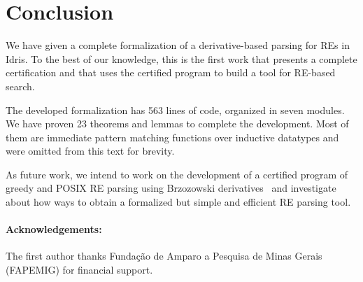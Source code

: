 \documentclass{llncs}
\begin{document}
\section{Conclusion}\label{sec:conclusion}

We have given a complete formalization of a derivative-based parsing
for REs in Idris. To the best of our knowledge, this is the first work
that presents a complete certification and that uses the certified
program to build a tool for RE-based search.

The developed formalization has 563 lines of code, organized in seven
modules. We have proven 23 theorems and lemmas to complete the
development. Most of them are immediate pattern matching functions
over inductive datatypes and were omitted from this text for brevity.

As future work, we intend to work on the development of a certified
program of greedy and POSIX RE parsing using Brzozowski
derivatives~\cite{SulzmannL14,FrischC04} and investigate about how
ways to obtain a formalized but simple and efficient RE parsing tool.

\paragraph{Acknowledgements:} The first author thanks Fundação de Amparo a
Pesquisa de Minas Gerais (FAPEMIG) for financial support.



\end{document}
